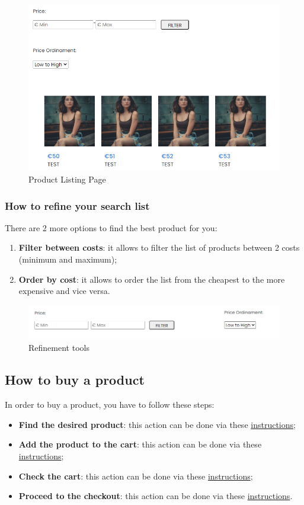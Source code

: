\begin{figure}[H]
    \centering
    \includegraphics[width=\linewidth]{res/images/cliente/plp.png}
    \caption{Product Listing Page}
\end{figure}

\subsubsection{How to refine your search list}
There are 2 more options to find the best product for you:
\begin{enumerate} 
    \item \textbf{Filter between costs}: it allows to filter the list of products between 2 costs (minimum and maximum);
    \item \textbf{Order by cost}: it allows to order the list from the cheapest to the more expensive and vice versa.
\end{enumerate}

\begin{figure}[H]
    \centering
    \includegraphics[width=35
    em]{res/images/cliente/refinementtools.png}
    \caption{Refinement tools}
\end{figure}

\subsection{How to buy a product} \label{_buyproduct}
In order to buy a product, you have to follow these steps:
\begin{itemize} 
    \item \textbf{Find the desired product}: this action can be done via these \hyperref[_lookforproduct]{instructions};
    \item \textbf{Add the product to the cart}: this action can be done via these \hyperref[_addproduct]{instructions};
    \item \textbf{Check the cart}: this action can be done via these \hyperref[_checkcart]{instructions};
    \item \textbf{Proceed to the checkout}: this action can be done via these \hyperref[_checkout]{instructions}.  
\end{itemize}

